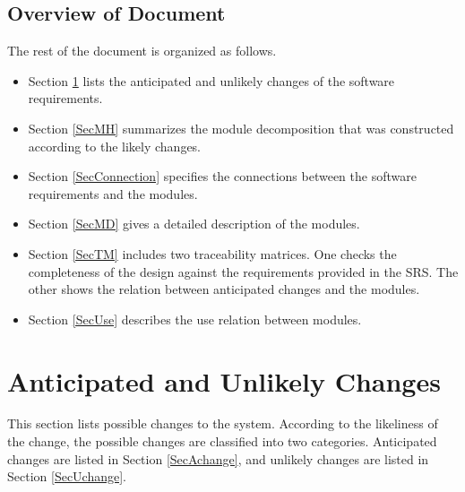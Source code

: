 \documentclass[12pt, titlepage]{article}
\begin{document}
\newpage
\subsection{Overview of Document}
The rest of the document is organized as follows. 

\begin{itemize}
    \item Section \ref{SecChange} lists the anticipated and unlikely changes of the software requirements. 
    \item Section \ref{SecMH} summarizes the module decomposition that was constructed according to the likely changes. 
    \item Section \ref{SecConnection} specifies the connections between the software requirements and the modules. \item Section \ref{SecMD} gives a detailed description of the modules. 
    \item Section \ref{SecTM} includes two traceability matrices. One checks the completeness of the design against the requirements provided in the SRS. The other shows the relation between anticipated changes and the modules. 
    \item Section \ref{SecUse} describes the use relation between modules. 
\end{itemize}

\section{Anticipated and Unlikely Changes} \label{SecChange}
This section lists possible changes to the system. According to the likeliness
of the change, the possible changes are classified into two
categories. Anticipated changes are listed in Section \ref{SecAchange}, and
unlikely changes are listed in Section \ref{SecUchange}.
\end{document}
